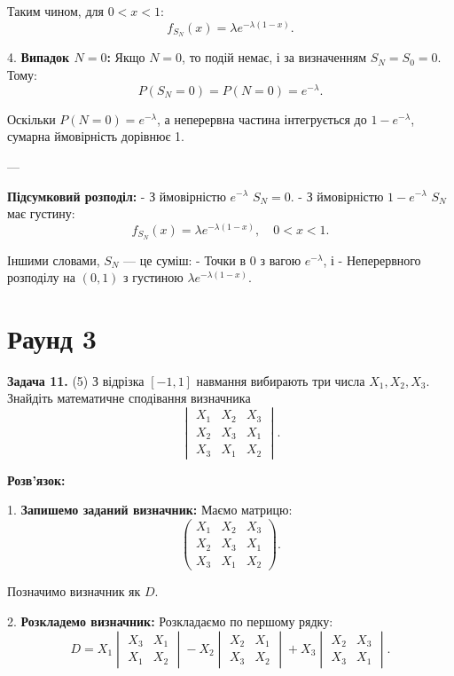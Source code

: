 \documentclass{article}
\begin{document}
   Таким чином, для \(0 < x < 1\):
   \[
   f_{S_N}(x) = \lambda e^{-\lambda(1-x)}.
   \]

4. \textbf{Випадок \(N=0\):}  
   Якщо \(N=0\), то подій немає, і за визначенням \(S_N = S_0 = 0\). Тому:
   \[
   P(S_N=0) = P(N=0) = e^{-\lambda}.
   \]

   Оскільки \(P(N=0)=e^{-\lambda}\), а неперервна частина інтегрується до \(1-e^{-\lambda}\), сумарна ймовірність дорівнює 1.

---

\textbf{Підсумковий розподіл:}
- З ймовірністю \(e^{-\lambda}\) \(S_N = 0\).
- З ймовірністю \(1 - e^{-\lambda}\) \(S_N\) має густину:
  \[
  f_{S_N}(x) = \lambda e^{-\lambda(1-x)}, \quad 0 < x < 1.
  \]

Іншими словами, \(S_N\) — це суміш:
- Точки в 0 з вагою \(e^{-\lambda}\), і
- Неперервного розподілу на \((0,1)\) з густиною \(\lambda e^{-\lambda(1-x)}\).

\section*{\centering \textbf{Раунд 3}}

\noindent\textbf{Задача 11.} (5) З відрізка \([-1, 1]\) навмання вибирають три числа \(X_1, X_2, X_3\). Знайдіть математичне сподівання визначника
\[
\begin{vmatrix}
X_1 & X_2 & X_3 \\
X_2 & X_3 & X_1 \\
X_3 & X_1 & X_2
\end{vmatrix}.
\]


\textbf{Розв’язок:}

1. \textbf{Запишемо заданий визначник:}  
   Маємо матрицю:
   \[
   \begin{pmatrix}
   X_1 & X_2 & X_3 \\
   X_2 & X_3 & X_1 \\
   X_3 & X_1 & X_2
   \end{pmatrix}.
   \]

   Позначимо визначник як \(D\).

2. \textbf{Розкладемо визначник:}  
   Розкладаємо по першому рядку:
   \[
   D = X_1 
   \begin{vmatrix}
   X_3 & X_1 \\
   X_1 & X_2
   \end{vmatrix}
   - X_2 
   \begin{vmatrix}
   X_2 & X_1 \\
   X_3 & X_2
   \end{vmatrix}
   + X_3
   \begin{vmatrix}
   X_2 & X_3 \\
   X_3 & X_1
   \end{vmatrix}.
   \]
\end{document}
